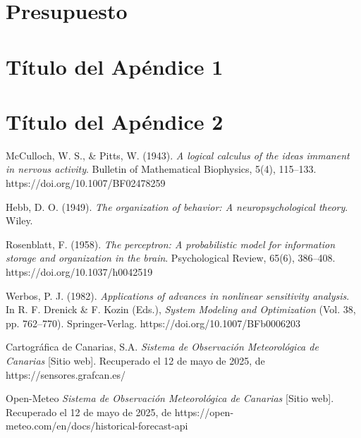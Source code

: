 \documentclass[spanish,a4paper,12pt,oneside]{extreport}
\begin{document}


\newpage{\pagestyle{empty}}
\thispagestyle{empty}

\chapter{\LARGE Presupuesto}
\label{chapter:presupuesto}



\newpage{\pagestyle{empty}\cleardoublepage}
\thispagestyle{empty}

\begin{appendix}

\chapter{\LARGE Título del Apéndice 1}
\label{appendix:1}


\chapter{\LARGE Título del Apéndice 2}
\label{appendix:2}


\end{appendix}


\begin{thebibliography}{X}
McCulloch, W. S., \& Pitts, W. (1943). \emph{A logical calculus of the ideas immanent in nervous activity}. Bulletin of Mathematical Biophysics, 5(4), 115–133. https://doi.org/10.1007/BF02478259

Hebb, D. O. (1949). \emph{The organization of behavior: A neuropsychological theory}. Wiley.

Rosenblatt, F. (1958). \emph{The perceptron: A probabilistic model for information storage and organization in the brain}. Psychological Review, 65(6), 386–408. https://doi.org/10.1037/h0042519

Werbos, P. J. (1982). \emph{Applications of advances in nonlinear sensitivity analysis}. In R. F. Drenick \& F. Kozin (Eds.), \emph{System Modeling and Optimization} (Vol. 38, pp. 762–770). Springer-Verlag. https://doi.org/10.1007/BFb0006203

Cartográfica de Canarias, S.A. \emph{Sistema de Observación Meteorológica de Canarias} [Sitio web]. Recuperado el 12 de mayo de 2025, de https://sensores.grafcan.es/

Open-Meteo \emph{Sistema de Observación Meteorológica de Canarias} [Sitio web]. Recuperado el 12 de mayo de 2025, de https://open-meteo.com/en/docs/historical-forecast-api

\end{thebibliography}
\end{document}

